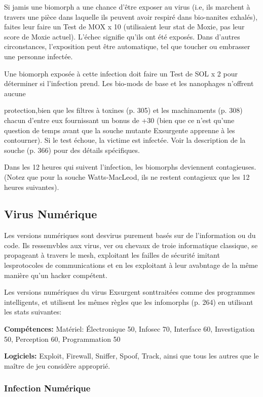 Si jamis une biomorph a une chance d'être exposer au virus (i.e, ils marchent à travers une pièce dans laquelle ils peuvent avoir respiré dans bio-nanites exhalés), faites leur faire un Test de MOX x 10 (utilisaient leur stat de Moxie, pas leur score de Moxie actuel). L'échec signifie qu'ils ont été exposés. Dans d'autres circonstances, l'exposition peut être automatique, tel que toucher ou embrasser une personne infectée. 

Une biomorph exposée à cette infection doit faire un Test de SOL x 2 pour déterminer si l'infection prend. Les bio-mods de base et les nanophages n'offrent aucune 

protection,bien que les filtres à toxines (p. 305) et les machinaments  (p. 308) chacun d'entre eux fournissant un bonus de +30 (bien que ce n'est qu'une question de temps avant que la souche mutante Exsurgente apprenne à les contourner). Si le test échoue, la victime est infectée. Voir la description de la souche (p. 366) pour des détails spécifiques. 

Dans les 12 heures qui suivent l'infection, les biomorphs deviennent contagieuses. (Notez que pour la souche Watts-MacLeod, ils ne restent contagieux que les 12 heures suivantes). 

\subsection{Virus Numérique} 

Les versions numériques sont desvirus purement basés sur de l'information ou du code. Ils ressemvbles aux virus, ver ou chevaux de troie informatique classique, se propageant à travers le mesh, exploitant les failles de sécurité imitant lesprotocoles de communications et en les exploitant à leur avabntage de la même manière qu'un hacker compétent. 

Les versions numériques du virus Exsurgent sonttraitées comme des programmes intelligents, et utilisent les mêmes règles que les infomorphs (p. 264) en utilisant les stats suivantes: 

\textbf{Compétences:} Matériel: Électronique 50, Infosec 70, Interface 60, Investigation 50, Perception 60, Programmation 50 

\textbf{Logiciels:} Exploit, Firewall, Sniffer, Spoof, Track, ainsi que tous les autres que le maître de jeu considère approprié. 

\subsubsection{Infection Numérique} 

